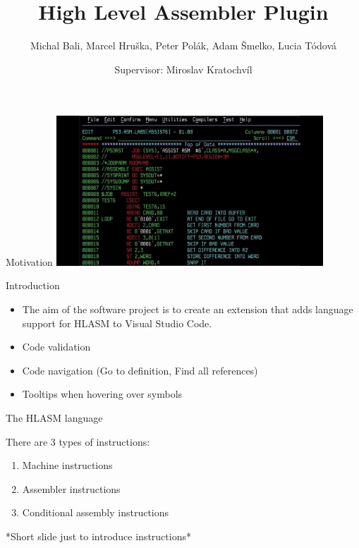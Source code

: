 \documentclass[10pt]{beamer}
\title{High Level Assembler Plugin}
\subtitle{}
\date{Supervisor: Miroslav Kratochvíl}
\author{Michal Bali, Marcel Hruška, Peter Polák, Adam Šmelko, Lucia Tódová}
\begin{document}
\maketitle


\begin{frame}[fragile]{Motivation}
\centering
\includegraphics[width=10cm]{img/maxresdefault}

\end{frame}

\begin{frame}[fragile]{Introduction}

    \begin{itemize}
    	\item The aim of the software project is to create an extension that adds language support for HLASM to Visual Studio Code.
    	\item Code validation
    	\item Code navigation (Go to definition, Find all references)
    	\item Tooltips when hovering over symbols
    \end{itemize}
\end{frame}



\begin{frame}[fragile]{The HLASM language}

There are 3 types of instructions:
\begin{enumerate}
	\item Machine instructions
	\item Assembler instructions
	\item Conditional assembly instructions
\end{enumerate}


*Short slide just to introduce instructions*

\end{frame}
\end{document}
